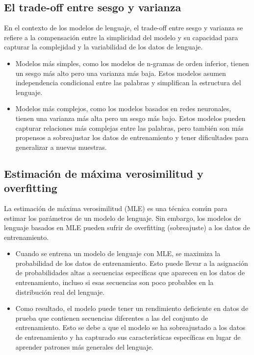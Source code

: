 \subsection{El trade-off entre sesgo y varianza}

En el contexto de los modelos de lenguaje, el trade-off entre sesgo y varianza se refiere a la compensación entre la simplicidad del modelo y su capacidad para capturar la complejidad y la variabilidad de los datos de lenguaje.

\begin{itemize}
    \item Modelos más simples, como los modelos de n-gramas de orden inferior, tienen un sesgo más alto pero una varianza más baja. Estos modelos asumen independencia condicional entre las palabras y simplifican la estructura del lenguaje.
    
    \item Modelos más complejos, como los modelos basados en redes neuronales, tienen una varianza más alta pero un sesgo más bajo. Estos modelos pueden capturar relaciones más complejas entre las palabras, pero también son más propensos a sobreajustar los datos de entrenamiento y tener dificultades para generalizar a nuevas muestras.
\end{itemize}

\subsection{Estimación de máxima verosimilitud y overfitting}

La estimación de máxima verosimilitud (MLE) es una técnica común para estimar los parámetros de un modelo de lenguaje. Sin embargo, los modelos de lenguaje basados en MLE pueden sufrir de overfitting (sobreajuste) a los datos de entrenamiento.

\begin{itemize}
    \item Cuando se entrena un modelo de lenguaje con MLE, se maximiza la probabilidad de los datos de entrenamiento. Esto puede llevar a la asignación de probabilidades altas a secuencias específicas que aparecen en los datos de entrenamiento, incluso si esas secuencias son poco probables en la distribución real del lenguaje.
    
    \item Como resultado, el modelo puede tener un rendimiento deficiente en datos de prueba que contienen secuencias diferentes a las del conjunto de entrenamiento. Esto se debe a que el modelo se ha sobreajustado a los datos de entrenamiento y ha capturado sus características específicas en lugar de aprender patrones más generales del lenguaje.
\end{itemize}

